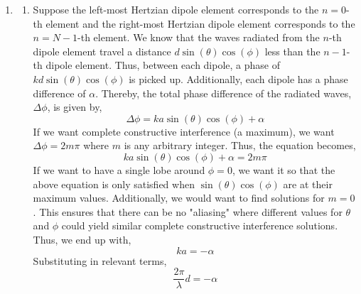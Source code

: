 \documentclass[12pt]{article}
\begin{document}
\begin{enumerate}
\begin{enumerate}
		
	\end{enumerate}

	\item [10.2]
	\begin{enumerate}
		\item [(a)]

		Suppose the left-most Hertzian dipole element corresponds to the $n=0$-th element and the right-most Hertzian dipole element corresponds to the $n=N-1$-th element.
		We know that the waves radiated from the $n$-th dipole element travel a distance $d\sin(\theta)\cos(\phi)$ less than the $n-1$-th dipole element.
		Thus, between each dipole, a phase of $kd\sin(\theta)\cos(\phi)$ is picked up.
		Additionally, each dipole has a phase difference of $\alpha$.
		Thereby, the total phase difference of the radiated waves, $\Delta \phi$, is given by,
		\[\Delta \phi = ka\sin(\theta)\cos(\phi)+\alpha\]
		If we want complete constructive interference (a maximum), we want $\Delta\phi = 2m\pi$ where $m$ is any arbitrary integer.
		Thus, the equation becomes,
		\[ka\sin(\theta)\cos(\phi)+\alpha = 2m\pi\]
		If we want to have a single lobe around $\phi = 0$, we want it so that the above equation is only satisfied when $\sin(\theta)\cos(\phi)$ are at their maximum values.
		Additionally, we would want to find solutions for $m=0$.
		This ensures that there can be no "aliasing" where different values for $\theta$ and $\phi$ could yield similar complete constructive interference solutions.
		Thus, we end up with,
		\[ka=-\alpha\]
		Substituting in relevant terms,
		\[\boxed{\frac{2\pi}{\lambda}d=-\alpha}\]


\end{enumerate}
\end{enumerate}
\end{document}
